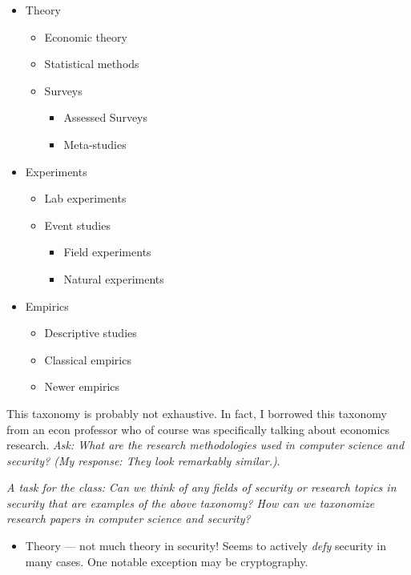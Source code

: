 \documentclass[11pt]{article}
\begin{document}
\begin{itemize}
    \item Theory
        \begin{itemize}
            \item Economic theory
            \item Statistical methods
            \item Surveys
                \begin{itemize}
                    \item Assessed Surveys
                    \item Meta-studies
                \end{itemize}
        \end{itemize}
    \item Experiments
        \begin{itemize}
            \item Lab experiments
            \item Event studies
                \begin{itemize}
                    \item Field experiments
                    \item Natural experiments
                \end{itemize}
        \end{itemize}
    \item Empirics
        \begin{itemize}
            \item Descriptive studies
            \item Classical empirics
            \item Newer empirics
        \end{itemize}
\end{itemize}


This taxonomy is probably not exhaustive. In fact, I borrowed this taxonomy from an econ professor who of course was specifically talking about economics research. {\it Ask: What are the research methodologies used in computer science and security? (My response: They look remarkably similar.)}.

{\it A task for the class: Can we think of any fields of security or research topics in security that are examples of the above taxonomy? How can we taxonomize research papers in computer science and security?}

\begin{itemize}
    \item Theory --- not much theory in security! Seems to actively {\it defy} security in many cases. One notable exception may be cryptography.
\end{itemize}
\end{document}
